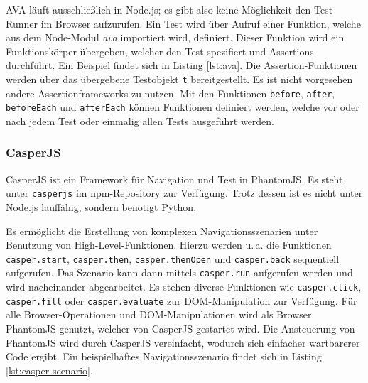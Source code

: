 AVA läuft ausschließlich in Node.js; es gibt also keine Möglichkeit den Test-Runner im Browser aufzurufen. Ein Test wird über Aufruf einer Funktion, welche aus dem Node-Modul \textit{ava} importiert wird, definiert. Dieser Funktion wird ein Funktionskörper übergeben, welcher den Test spezifiert und Assertions durchführt. Ein Beispiel findet sich in Listing \ref{lst:ava}. Die Assertion-Funktionen werden über das übergebene Testobjekt \texttt{t} bereitgestellt. Es ist nicht vorgesehen andere Assertionframeworks zu nutzen. Mit den Funktionen \texttt{before}, \texttt{after}, \texttt{beforeEach} und \texttt{afterEach} können Funktionen definiert werden, welche vor oder nach jedem Test oder einmalig allen Tests ausgeführt werden.\cite{ava}

\begin{figure}[H]
	
\end{figure}

\subsubsection{CasperJS}
\label{sec:CasperJS}
CasperJS ist ein Framework für Navigation und Test in PhantomJS. Es steht unter \texttt{casperjs} im npm-Repository zur Verfügung.\cite{casperjs-index} Trotz dessen ist es nicht unter Node.js lauffähig\cite{casperjs-faq}, sondern benötigt Python\cite{casperjs-installation}.

Es ermöglicht die Erstellung von komplexen Navigationsszenarien unter Benutzung von High-Level-Funktionen. Hierzu werden u.\,a. die Funktionen \texttt{casper.start}, \texttt{casper.then}, \texttt{casper.thenOpen} und \texttt{casper.back} sequentiell aufgerufen. Das Szenario kann dann mittels \texttt{casper.run} aufgerufen werden und wird nacheinander abgearbeitet. Es stehen diverse Funktionen wie \texttt{casper.click}, \texttt{casper.fill} oder \texttt{casper.evaluate} zur DOM-Manipulation zur Verfügung. Für alle Browser-Operationen und DOM-Manipulationen wird als Browser PhantomJS genutzt, welcher von CasperJS gestartet wird. Die Ansteuerung von PhantomJS wird durch CasperJS vereinfacht, wodurch sich einfacher wartbarerer Code ergibt\cite{casperjs-better-phantomjs}. Ein beispielhaftes Navigationsszenario findet sich in Listing \ref{lst:casper-scenario}.\cite{casperjs-index}

\begin{figure}[H]
	
\end{figure}

